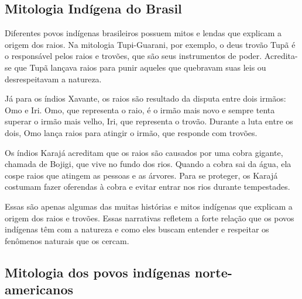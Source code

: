 \documentclass[a4paper, 12pt, onecolumn,singlespacing]{article}
\begin{document}
	\subsection{Mitologia Indígena do Brasil}
	
	Diferentes povos indígenas brasileiros possuem mitos e lendas que explicam a origem dos raios. Na mitologia Tupi-Guarani, por exemplo, o deus trovão Tupã é o responsável pelos raios e trovões, que são seus instrumentos de poder. Acredita-se que Tupã lançava raios para punir aqueles que quebravam suas leis ou desrespeitavam a natureza.
	
	Já para os índios Xavante, os raios são resultado da disputa entre dois irmãos: Omo e Iri. Omo, que representa o raio, é o irmão mais novo e sempre tenta superar o irmão mais velho, Iri, que representa o trovão. Durante a luta entre os dois, Omo lança raios para atingir o irmão, que responde com trovões.
	
	Os índios Karajá acreditam que os raios são causados por uma cobra gigante, chamada de Bojigi, que vive no fundo dos rios. Quando a cobra sai da água, ela cospe raios que atingem as pessoas e as árvores. Para se proteger, os Karajá costumam fazer oferendas à cobra e evitar entrar nos rios durante tempestades.
	
	Essas são apenas algumas das muitas histórias e mitos indígenas que explicam a origem dos raios e trovões. Essas narrativas refletem a forte relação que os povos indígenas têm com a natureza e como eles buscam entender e respeitar os fenômenos naturais que os cercam.
	
	\subsection{Mitologia dos povos indígenas norte-americanos}
	
\end{document}
